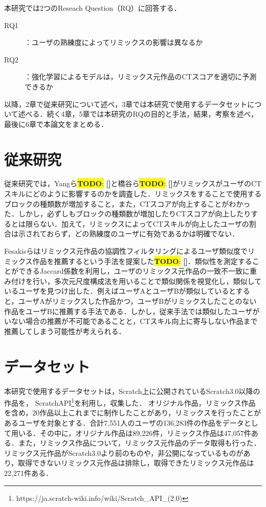\documentclass[submit,techrep,noauthor]{ipsj}
\newcommand{\todo}[1]{\colorbox{yellow}{{\bf TODO}:}{\color{red} {\textbf{[#1]}}}}
\begin{document}
本研究では2つのReseach Question（RQ）に回答する．

\begin{description}
  \item[RQ1]：ユーザの熟練度によってリミックスの影響は異なるか
  \item[RQ2]：強化学習によるモデルは，リミックス元作品のCTスコアを適切に予測できるか
\end{description}

以降，2章で従来研究について述べ，3章では本研究で使用するデータセットについて述べる．続く4章，5章では本研究のRQの目的と手法，結果，考察を述べ，最後に6章で本論文をまとめる．

\section{従来研究}
従来研究では，Yangら\todo{}と橋谷ら\todo{}がリミックスがユーザのCTスキルにどのように影響するのかを調査した．リミックスをすることで使用するブロックの種類数が増加すること，また，CTスコアが向上することがわかった．しかし，必ずしもブロックの種類数が増加したりCTスコアが向上したりするとは限らない．加えて，リミックスによってCTスキルが向上したユーザの割合は示されておらず，どの熟練度のユーザに有効であるかは明確でない．

Fesakisらはリミックス元作品の協調性フィルタリングによるユーザ類似度でリミックス作品を推薦するという手法を提案した\todo{}．類似性を測定することができるJaccard係数を利用し，ユーザのリミックス元作品の一致不一致に重み付けを行い，多次元尺度構成法を用いることで類似関係を視覚化し，類似しているユーザを見つけ出した．例えばユーザAとユーザBが類似しているとすると，ユーザAがリミックスした作品かつ，ユーザBがリミックスしたことのない作品をユーザBに推薦する手法である．しかし，従来手法では類似したユーザがいない場合の推薦が不可能であることと，CTスキル向上に寄与しない作品まで推薦してしまう可能性が考えられる．


\section{データセット}
本研究で使用するデータセットは，Scratch上に公開されているScratch3.0以降の作品を，
ScratchAPI\footnote{https://ja.scratch-wiki.info/wiki/Scratch\_API\_(2.0)}を利用し，収集した．
オリジナル作品，リミックス作品を含め，20作品以上これまでに制作したことがあり，リミックスを行ったことがあるユーザを対象とする．合計7,551人のユーザの136,283件の作品をデータとして用いる．その中に，オリジナル作品は89,226件，リミックス作品は47,057件ある．また，リミックス作品について，リミックス元作品のデータ取得も行った．リミックス元作品がScratch3.0より前のものや，非公開になっているものがあり，取得できないリミックス元作品は排除し，取得できたリミックス元作品は22,271件ある．
\end{document}

